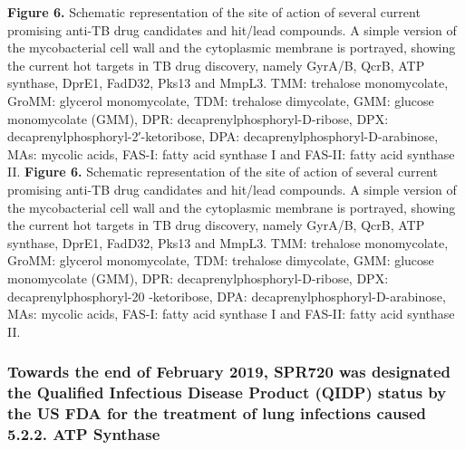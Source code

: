 \documentclass{article}
\begin{document}
\textbf{Figure 6.} Schematic representation of the site of action of several current promising anti-TB drug candidates and hit/lead compounds. A simple version of the mycobacterial cell wall and the cytoplasmic membrane is portrayed, showing the current hot targets in TB drug discovery, namely GyrA/B, QcrB, ATP synthase, DprE1, FadD32, Pks13 and MmpL3. TMM: trehalose monomycolate, GroMM: glycerol monomycolate, TDM: trehalose dimycolate, GMM: glucose monomycolate (GMM), DPR: decaprenylphosphoryl-D-ribose, DPX: decaprenylphosphoryl-2′-ketoribose, DPA: decaprenylphosphoryl-D-arabinose, MAs: mycolic acids, FAS-I: fatty acid synthase I and FAS-II: fatty acid synthase II. \textbf{Figure 6.} Schematic representation of the site of action of several current promising anti-TB drug candidates and hit/lead compounds. A simple version of the mycobacterial cell wall and the cytoplasmic membrane is portrayed, showing the current hot targets in TB drug discovery, namely GyrA/B, QcrB, ATP synthase, DprE1, FadD32, Pks13 and MmpL3. TMM: trehalose monomycolate, GroMM: glycerol monomycolate, TDM: trehalose dimycolate, GMM: glucose monomycolate (GMM), DPR: decaprenylphosphoryl-D-ribose, DPX: decaprenylphosphoryl-20 -ketoribose, DPA: decaprenylphosphoryl-D-arabinose, MAs: mycolic acids, FAS-I: fatty acid synthase I and FAS-II: fatty acid synthase II.

\subsubsection{Towards the end of February 2019, SPR720 was designated the Qualified Infectious Disease Product (QIDP) status by the US FDA for the treatment of lung infections caused 5.2.2. ATP Synthase}
\end{document}
